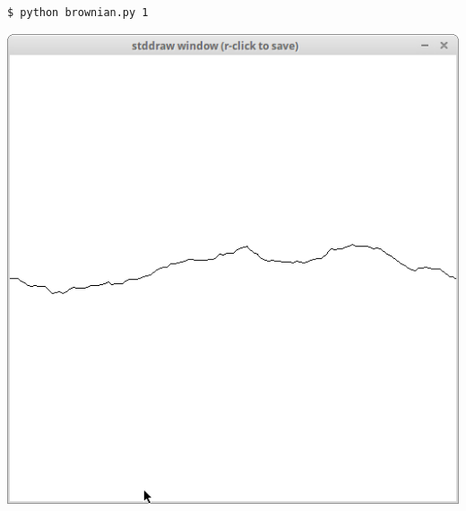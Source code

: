 \documentclass[8pt,a4paper,compress]{beamer}
\begin{document}
\begin{frame}[fragile]
\begin{minipage}{160pt}
\begin{lstlisting}[language={}]
$ python brownian.py 1
\end{lstlisting}
\end{minipage}%
\begin{minipage}{140pt}
\hfill \includegraphics[scale=0.15]{figures/brownian1.png}
\end{minipage}

\smallskip


\end{frame}
\end{document}
